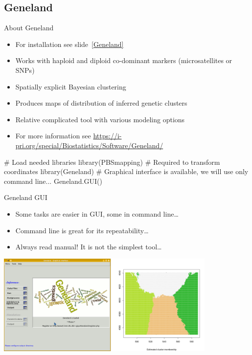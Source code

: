 \documentclass[compress, xelatex, 11pt, xcolor=svgnames, aspectratio=169,
	hyperref={
		bookmarks=true,
		unicode=true,
		colorlinks=true,
		pdftitle={Molecular data in R},
		plainpages=false,
		pdfauthor={Vojtech Zeisek},
		pdfsubject={Course about phylogeny and evolution in R},
		pdfcreator={XeLaTeX},
		pdfkeywords={R, evolution, phylogeny, molecular data},
		linkcolor=Crimson, %
		anchorcolor=Magenta, %
		citecolor=Magenta, %
		filecolor=Magenta, %
		menucolor=Magenta, %
		urlcolor=DodgerBlue, %
		},
	url={hyphens, lowtilde} %
	]{beamer}
\begin{document}
\subsection{Geneland}

\begin{frame}[fragile]{About Geneland}
	\label{GenelandUse}
	\begin{itemize}
		\item For installation see slide~\ref{Geneland}
		\item Works with haploid and diploid co-dominant markers (microsatellites or SNPs)
		\item Spatially explicit Bayesian clustering
		\item Produces maps of distribution of inferred genetic clusters
		\item Relative complicated tool with various modeling options
		\item For more information see \url{https://i-pri.org/special/Biostatistics/Software/Geneland/}
	\end{itemize}
	\vfill
	\begin{spluscode}
    # Load needed libraries
    library(PBSmapping) # Required to transform coordinates
    library(Geneland)
    # Graphical interface is available, we will use only command line...
    Geneland.GUI()
	\end{spluscode}
\end{frame}

\begin{frame}{Geneland GUI}
	\begin{itemize}
		\item Some tasks are easier in GUI, some in command line\ldots
		\item Command line is great for its repeatability\ldots
		\item Always read manual! It is not the simplest tool\ldots
	\end{itemize}
	\begin{center}
		\includegraphics[height=5cm]{geneland_gui.png}
	\end{center}
\end{frame}
\end{document}

